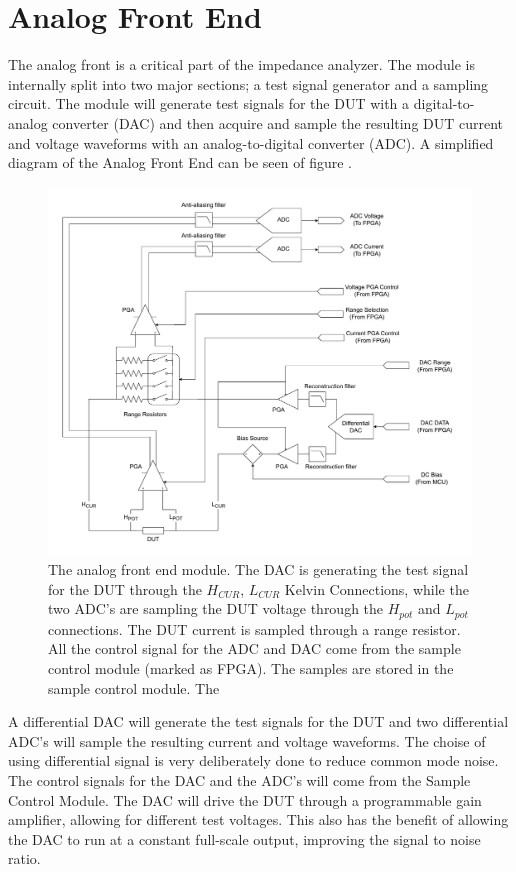 \section{Analog Front End} \label{sec:AnalogFrontEnd}

The analog front is a critical part of the impedance analyzer. The module is internally split into two major sections; a test signal generator and a sampling circuit. The module will generate test signals for the DUT with a digital-to-analog converter (DAC) and then acquire and sample the resulting DUT current and voltage waveforms with an analog-to-digital converter (ADC). A simplified diagram of the Analog Front End can be seen of figure . 
\begin{figure}[H]
    \centering
    \includegraphics[clip, trim=0 0 0 0,width=1\textwidth]{Sections/6_SystemArchitecture/Figures/AnalogFrontEndDetailedBlock.pdf}
    \caption{The analog front end module. The DAC is generating the test signal for the DUT through the $H_{CUR}$, $L_{CUR}$ Kelvin Connections, while the two ADC's are sampling the DUT voltage through the $H_{pot}$ and $L_{pot}$ connections. The DUT current is sampled through a range resistor. All the control signal for the ADC and DAC come from the sample control module (marked as FPGA). The samples are stored in the sample control module. The  }
    \label{fig_6_1_AnalogFrontEnd}
\end{figure}

A differential DAC will generate the test signals for the DUT and two differential ADC's will sample the resulting current and voltage waveforms. The choise of using differential signal is very deliberately done to reduce common mode noise. The control signals for the DAC and the ADC's will come from the Sample Control Module. The DAC will drive the DUT through a programmable gain amplifier, allowing for different test voltages. This also has the benefit of allowing the DAC to run at a constant full-scale output, improving the signal to noise ratio. 

